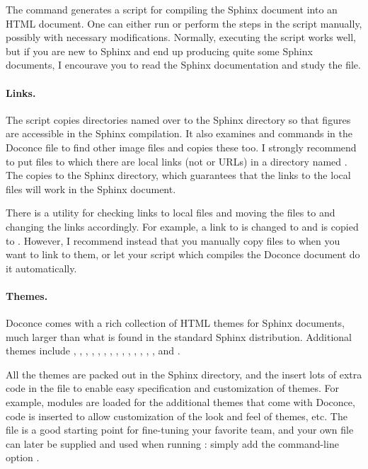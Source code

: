 \documentclass[%
oneside,                 %
final,                   %
10pt]{article}
\begin{document}
{{The  command generates a script
 for compiling the Sphinx document into an HTML
document.  One can either run  or perform the
steps in the script manually, possibly with necessary modifications.
Normally, executing the script works well, but if you are new
to Sphinx and end up producing quite some Sphinx documents, I encourave
you to read the Sphinx documentation and study the 
file.

\paragraph{Links.}
The  script copies directories named 
over to the Sphinx directory so that figures are accessible
in the Sphinx compilation.  It also examines  and 
commands in the Doconce file to find other image files and copies
these too. I strongly recommend to put files
to which there are local links (not  or  URLs) in
a directory named . The  copies
 to the Sphinx directory, which guarantees that the links
to the local files will work in the Sphinx document.

There is a utility  for checking links to
local files and moving the files to  and changing the links
accordingly. For example, a link to  is changed
to  and  is copied to .
However, I recommend instead that you manually copy
files to  when you want to link to them, or let your
script which compiles the Doconce document do it automatically.

\paragraph{Themes.}
Doconce comes with a rich collection of HTML themes for Sphinx documents,
much larger than what is found in the standard Sphinx distribution.
Additional themes include
,
,
,
,
,
,
,
,
,
,
,
,
,
, and
.

All the themes are packed out in the Sphinx directory, and the
 insert lots of extra code in the 
file to enable easy specification and customization of themes.
For example, modules are loaded for the additional themes that
come with Doconce, code is inserted to allow customization of
the look and feel of themes, etc. The  file is a
good starting point for fine-tuning your favorite team, and your
own  file can later be supplied and used when running
: simply add the command-line option
.

}}
\end{document}
